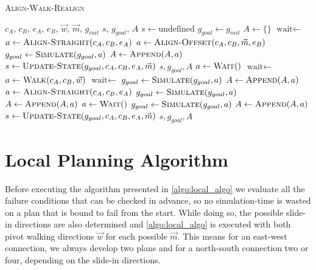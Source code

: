 \begin{algorithm}
	\caption{\scshape Align-Walk-Realign}
	\label{algo:local_algo}
	\begin{algorithmic}
		\REQUIRE $c_A$, $c_B$, $e_A$, $e_B$, $\vec{w}$, $\vec{m}$, $g_{init}$ 
		\ENSURE $s$, $g_{goal}$, $A$
		\STATE $s \gets \text{undefined}$
		\STATE $g_{goal} \gets g_{init}$
		\STATE $A \gets \{\}$
		\STATE $\text{wait} \gets$ \TRUE
		\LOOP
				\STATE $a \gets \text{\scshape Align-Straight}(c_A, c_B, e_A)$
			\ELSE
				\STATE $a \gets \text{\scshape Align-Offset}(c_A, c_B, \vec{m}, e_B)$
			\ENDIF
			\STATE $g_{goal} \gets \text{\scshape Simulate}(g_{goal}, a)$
			\STATE $A \gets \text{\scshape Append}(A, a)$
			\STATE $s \gets \text{\scshape Update-State}(g_{goal}, c_A, c_B, e_A, \vec{m})$
				\RETURN $s, g_{goal}, A$
			\ENDIF
				\STATE $a \gets \text{\scshape Wait}()$
				\STATE $\text{wait} \gets$ \FALSE
			\ELSE
				\STATE $a \gets \text{\scshape Walk}(c_A, c_B, \vec{w})$
				\STATE $\text{wait} \gets$ \TRUE
			\ENDIF
			\STATE $g_{goal} \gets \text{\scshape Simulate}(g_{goal}, a)$
			\STATE $A \gets \text{\scshape Append}(A, a)$
				\STATE $a \gets \text{\scshape Align-Straight}(c_A, c_B, e_A)$
				\STATE $g_{goal} \gets \text{\scshape Simulate}(g_{goal}, a)$
				\STATE $A \gets \text{\scshape Append}(A, a)$
					\STATE $a \gets \text{\scshape Wait}()$
					\STATE $g_{goal} \gets \text{\scshape Simulate}(g_{goal}, a)$
					\STATE $A \gets \text{\scshape Append}(A, a)$
				\ENDWHILE
			\ENDIF
			\STATE $s \gets \text{\scshape Update-State}(g_{goal}, c_A, c_B, e_A, \vec{m})$
				\RETURN $s, g_{goal}, A$
			\ENDIF
		\ENDLOOP 
	\end{algorithmic}
\end{algorithm}

\section{Local Planning Algorithm}
\label{sec:local_algo}

Before executing the algorithm presented in \autoref{algo:local_algo} we evaluate all the failure conditions that can be checked in advance, so no simulation-time is wasted on a plan that is bound to fail from the start.
While doing so, the possible slide-in directions are also determined and \autoref{algo:local_algo} is executed with both pivot walking directions $\vec{w}$ for each possible $\vec{m}$.
This means for an east-west connection, we always develop two plans and for a north-south connection two or four, depending on the slide-in directions.

